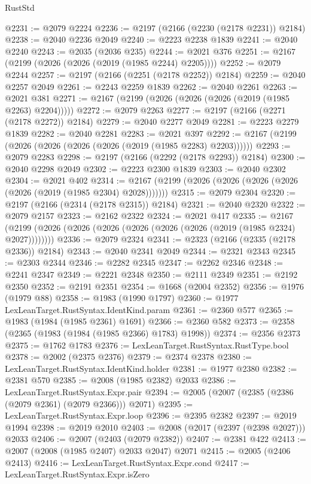 \begin{lexlean}{RustStd}
\begin{coremodule}
@2231 := @2079 @2224
@2236 := @2197 (@2166 (@2230 (@2178 @2231)) @2184)
@2238 := @2040 @2236 @2049
@2240 := @2223 @2238 @1839
@2241 := @2040 @2240
@2243 := @2035 (@2036 @235)
@2244 := @2021 @376
@2251 := @2167 (@2199 (@2026 (@2026 (@2019 (@1985 @2244) @2205))))
@2252 := @2079 @2244
@2257 := @2197 (@2166 (@2251 (@2178 @2252)) @2184)
@2259 := @2040 @2257 @2049
@2261 := @2243 @2259 @1839
@2262 := @2040 @2261
@2263 := @2021 @381
@2271 := @2167 (@2199 (@2026 (@2026 (@2026 (@2019 (@1985 @2263) @2204)))))
@2272 := @2079 @2263
@2277 := @2197 (@2166 (@2271 (@2178 @2272)) @2184)
@2279 := @2040 @2277 @2049
@2281 := @2223 @2279 @1839
@2282 := @2040 @2281
@2283 := @2021 @397
@2292 := @2167 (@2199 (@2026 (@2026 (@2026 (@2026 (@2019 (@1985 @2283) @2203))))))
@2293 := @2079 @2283
@2298 := @2197 (@2166 (@2292 (@2178 @2293)) @2184)
@2300 := @2040 @2298 @2049
@2302 := @2223 @2300 @1839
@2303 := @2040 @2302
@2304 := @2021 @402
@2314 := @2167 (@2199 (@2026 (@2026 (@2026 (@2026 (@2026 (@2019 (@1985 @2304) @2028)))))))
@2315 := @2079 @2304
@2320 := @2197 (@2166 (@2314 (@2178 @2315)) @2184)
@2321 := @2040 @2320
@2322 := @2079 @2157
@2323 := @2162 @2322
@2324 := @2021 @417
@2335 := @2167 (@2199 (@2026 (@2026 (@2026 (@2026 (@2026 (@2026 (@2019 (@1985 @2324) @2027))))))))
@2336 := @2079 @2324
@2341 := @2323 (@2166 (@2335 (@2178 @2336)) @2184)
@2343 := @2040 @2341 @2049
@2344 := @2321 @2343
@2345 := @2303 @2344
@2346 := @2282 @2345
@2347 := @2262 @2346
@2348 := @2241 @2347
@2349 := @2221 @2348
@2350 := @2111 @2349
@2351 := @2192 @2350
@2352 := @2191 @2351
@2354 := @1668 (@2004 @2352)
@2356 := @1976 (@1979 @88)
@2358 := @1983 (@1990 @1797)
@2360 := @1977 LexLeanTarget.RustSyntax.IdentKind.param
@2361 := @2360 @577
@2365 := @1983 (@1984 (@1985 @2361) @1691)
@2366 := @2360 @582
@2373 := @2358 (@2365 (@1983 (@1984 (@1985 @2366) @1783) @1998))
@2374 := @2356 @2373
@2375 := @1762 @1783
@2376 := LexLeanTarget.RustSyntax.RustType.bool
@2378 := @2002 (@2375 @2376)
@2379 := @2374 @2378
@2380 := LexLeanTarget.RustSyntax.IdentKind.holder
@2381 := @1977 @2380
@2382 := @2381 @570
@2385 := @2008 (@1985 @2382) @2033
@2386 := LexLeanTarget.RustSyntax.Expr.pair
@2394 := @2005 (@2007 (@2385 (@2386 (@2079 @2361) (@2079 @2366))) @2071)
@2395 := LexLeanTarget.RustSyntax.Expr.loop
@2396 := @2395 @2382
@2397 := @2019 @1994
@2398 := @2019 @2010
@2403 := @2008 (@2017 (@2397 (@2398 @2027))) @2033
@2406 := @2007 (@2403 (@2079 @2382))
@2407 := @2381 @422
@2413 := @2007 (@2008 (@1985 @2407) @2033 @2047) @2071
@2415 := @2005 (@2406 @2413)
@2416 := LexLeanTarget.RustSyntax.Expr.cond
@2417 := LexLeanTarget.RustSyntax.Expr.isZero

\end{coremodule}
\end{lexlean}

